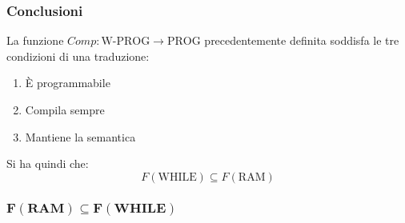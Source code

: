 \subsubsection*{Conclusioni}
La funzione $Comp:\text{W-PROG}\to\text{PROG}$ precedentemente definita soddisfa le tre
condizioni di una traduzione:
\begin{enumerate}
    \item È programmabile
    \item Compila sempre
    \item Mantiene la semantica
\end{enumerate}

Si ha quindi che:
$$ F(\text{WHILE})\subseteq F(\text{RAM}) $$

\subsubsection{\texorpdfstring{$\bm{F(\text{RAM})\subseteq F(\text{WHILE})}$}
{F(RAM) sottoinsieme F(WHILE)}}